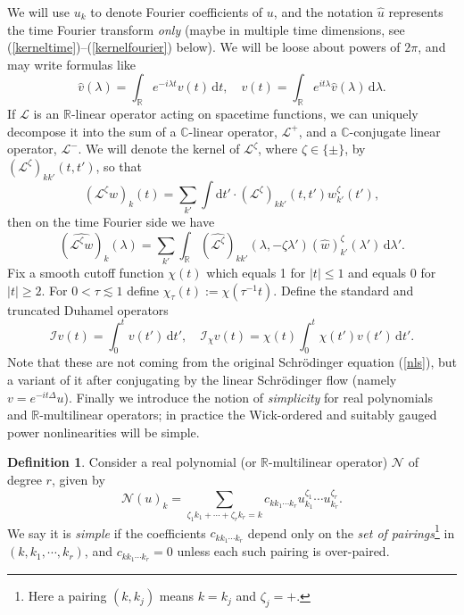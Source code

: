 \documentclass[11 pt,reqno]{amsart}
\theoremstyle{definition}
\newtheorem{df}[thm]{Definition}
\theoremstyle{remark}
\numberwithin{equation}{section}
\newcommand{\Nc}{\mathcal{N}}
\newcommand{\Ic}{\mathcal{I}}
\newcommand{\Cb}{\mathbb{C}}
\newcommand{\Rb}{\mathbb{R}}
\newcommand{\Ls}{\mathscr{L}}
\begin{document}
{We will use $u_k$ to denote Fourier coefficients of $u$, and the notation $\widehat{u}$ represents the time Fourier transform \emph{only} (maybe in multiple time dimensions, see (\ref{kerneltime})--(\ref{kernelfourier}) below). We will be loose about powers of $2\pi$, and may write formulas like 
\[\widehat{v}(\lambda)=\int_\Rb e^{-i\lambda t}v(t)\,\mathrm{d}t,\quad v(t)=\int_\Rb e^{it\lambda}\widehat{v}(\lambda)\,\mathrm{d}\lambda.\] If $\Ls$ is an $\Rb$-linear operator acting on spacetime functions, we can uniquely decompose it into the sum of a $\Cb$-linear operator, $\Ls^+$, and a $\Cb$-conjugate linear operator, $\Ls^-$. We will denote the kernel of $\Ls^\zeta$, where $\zeta\in\{\pm\}$, by $(\Ls^\zeta)_{kk'}(t,t')$, so that
\begin{equation}\label{kerneltime}(\Ls^\zeta w)_k(t)=\sum_{k'}\int\mathrm{d}t'\cdot (\Ls^\zeta)_{kk'}(t,t')w_{k'}^\zeta(t'),\end{equation} then on the time Fourier side we have 
\begin{equation}\label{kernelfourier}(\widehat{\Ls^\zeta w})_k(\lambda)=\sum_{k'}\int_\Rb (\widehat{\Ls^\zeta})_{kk'}(\lambda,-\zeta\lambda')(\widehat{w})_{k'}^\zeta(\lambda')\,\mathrm{d}\lambda'.\end{equation}Fix a smooth cutoff function $\chi(t)$ which equals 1 for $|t|\leq 1$ and equals 0 for $|t|\geq 2$. For $0<\tau\lesssim 1$ define $\chi_\tau(t):=\chi(\tau^{-1}t)$. Define the standard and truncated Duhamel operators
\begin{equation}\label{defi}\Ic v(t)=\int_0^tv(t')\,\mathrm{d}t',\quad \Ic_\chi v(t)=\chi(t)\int_0^t\chi(t')v(t')\,\mathrm{d}t'.
\end{equation} Note that these are not coming from the original Schr\"{o}dinger equation (\ref{nls}), but a variant of it after conjugating by the linear Schr\"{o}dinger flow (namely $v=e^{-it\Delta}u$). Finally we introduce the notion of \emph{simplicity} for real polynomials and $\Rb$-multilinear operators; in practice the Wick-ordered and suitably gauged power nonlinearities will be simple.
\begin{df}\label{def:simple} Consider a real polynomial (or $\Rb$-multilinear operator) $\Nc$ of degree $r$, given by
\begin{equation}\label{sec2.1:nonlinear}
\Nc(u)_k=\sum_{\zeta_1k_1+\cdots+\zeta_rk_r=k}c_{kk_1\cdots k_r}u_{k_1}^{\zeta_1}\cdots u_{k_r}^{\zeta_r}.
\end{equation}
We say it is \emph{simple} if the coefficients $c_{kk_1\cdots k_r}$ depend only on the \emph{set of pairings}\footnote{Here a pairing $(k,k_j)$ means $k=k_j$ and $\zeta_j=+$.} in $(k,k_1,\cdots,k_r)$, and $c_{kk_1\cdots k_r}=0$ unless each such pairing is over-paired. 
\end{df}
}
\end{document}
